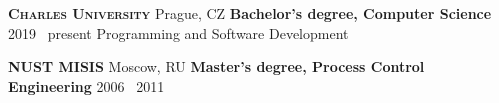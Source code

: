 
\vspace{1.0em}

\textsc{\textbf{Charles University}} \textsuperscript{\href{https://www.cuni.cz/}{\faExternalLink}}
\hfill Prague, CZ \newline
\textbf{Bachelor's degree, Computer Science}
\hfill 2019 \textendash\ present \newline
Programming and Software Development

\vspace{1.0em}

\textsc{\textbf{NUST MISIS}} \textsuperscript{\href{https://www.misis.ru/}{\faExternalLink}}
\hfill Moscow, RU \newline
\textbf{Master's degree, Process Control Engineering}
\hfill 2006 \textendash\ 2011

\vspace{1.0em}
